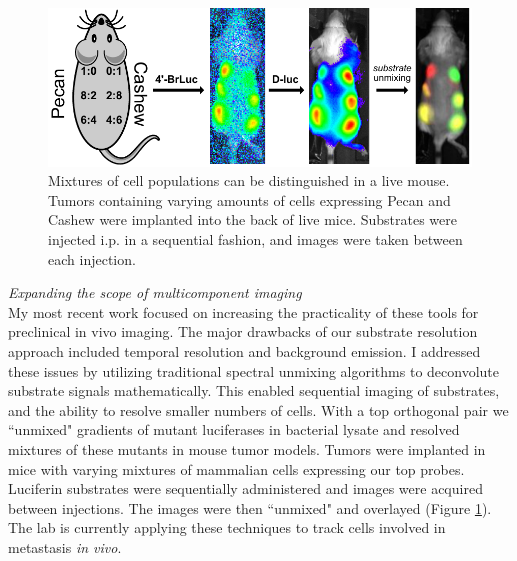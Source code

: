 \documentclass[11pt]{article}
\begin{document}
\begin{figure}
\begin{centering}
\includegraphics[width=\textwidth]{figures/mouse_unmixing.pdf}

\end{centering}
\footnotesize
\caption{\label{figure:mouse_unmixing}
Mixtures of cell populations can be distinguished in a live mouse. Tumors containing varying amounts of cells expressing Pecan and Cashew were implanted into the back of live mice. Substrates were injected i.p. in a sequential fashion, and images were taken between each injection.
}
\end{figure}

\textit{Expanding the scope of multicomponent imaging}\\
My most recent work focused on increasing the practicality of these tools for preclinical in vivo imaging. The major drawbacks of our substrate resolution approach included temporal resolution and background emission. I addressed these issues by utilizing traditional spectral unmixing algorithms to deconvolute substrate signals mathematically. This enabled sequential imaging of substrates, and the ability to resolve smaller numbers of cells. With a top orthogonal pair we ``unmixed" gradients of mutant luciferases in bacterial lysate and resolved mixtures of these mutants in mouse tumor models. Tumors were implanted in mice with varying mixtures of mammalian cells expressing our top probes. Luciferin substrates were sequentially administered and images were acquired between injections. The images were then ``unmixed" and overlayed (Figure \ref{figure:mouse_unmixing}). The lab is currently applying these techniques to track cells involved in metastasis \textit{in vivo}.
\end{document}
